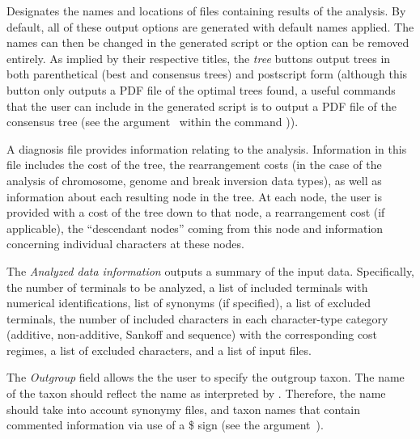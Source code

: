 \begin{description}
\setlength{\parindent}{0.5cm}	   
        \item[Output Files]
        		Designates the names and locations of files containing results of the analysis. 
        		By default, all of these output options are generated with default names applied.  The names can 
      		then be changed in the generated script or the option can be removed entirely.  As implied by their 
        		respective titles, the \emph{tree} buttons output trees in both parenthetical (best and 
        		consensus trees) and postscript form (although this button only outputs a PDF file of the optimal trees
		found, a useful commands that the user can include in the generated script is to output 
		a PDF file of the consensus tree (see the argument~ 
		within the command )). 
        
        		\indent A diagnosis file provides information relating to the analysis. Information in this file includes 
		the cost of the tree, the rearrangement costs (in the case of the analysis of chromosome, genome and 
		break inversion data types), as well as information about each resulting node in the tree.  At each node, 
		the user is provided with a cost of the tree down to that node, a rearrangement cost (if applicable), the ``descendant nodes'' 
		coming from this node and information concerning individual characters at these nodes.
		
		\indent The \emph{Analyzed data information} outputs a summary of the input data. Specifically, 
		the number of terminals to be analyzed, a list of included terminals with numerical identifications, 
		list of synonyms (if specified), a list of excluded terminals, the number of included characters in each 
		character-type category (additive, non-additive, Sankoff and sequence) with the corresponding cost 
		regimes, a list of excluded characters, and a list of input files.    
		
		\indent The \emph{Outgroup} field allows the the user to specify the outgroup taxon.  The name of the taxon
		should reflect the name as interpreted by \poy.  Therefore, the name should take into account synonymy files, 
		and taxon names that contain commented information via use of a \$ sign (see the argument~).
\end{description}

